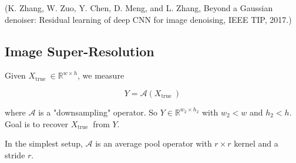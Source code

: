 \begin{definition}[8.4][DnCNN]
    (K. Zhang, W. Zuo, Y. Chen, D. Meng, and L. Zhang, Beyond a Gaussian denoiser: Residual learning of deep CNN for image denoising, IEEE TIP, 2017.)
\end{definition}

\subsection{Image Super-Resolution}

\begin{definition}
    Given $X_{\text {true }} \in \mathbb{R}^{w \times h}$, we measure

    $$
    Y=\mathcal{A}\left(X_{\text {true }}\right)
    $$

    where $\mathcal{A}$ is a "downsampling" operator. So $Y \in \mathbb{R}^{w_{2} \times h_{2}}$ with $w_{2}<w$ and $h_{2}<h$. Goal is to recover $X_{\text {true }}$ from $Y$.

    In the simplest setup, $\mathcal{A}$ is an average pool operator with $r \times r$ kernel and a stride $r$.
\end{definition}

